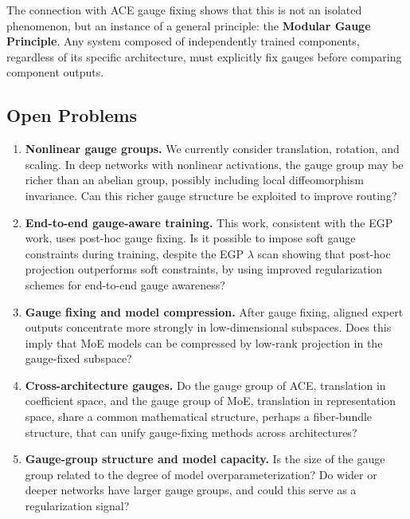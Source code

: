 \documentclass[12pt,a4paper]{article}
\theoremstyle{remark}
\begin{document}
The connection with ACE gauge fixing shows that this is not an isolated phenomenon, but an instance of a general principle: the \textbf{Modular Gauge Principle}. Any system composed of independently trained components, regardless of its specific architecture, must explicitly fix gauges before comparing component outputs.

\subsection{Open Problems}

\begin{enumerate}[label=\textbf{(O\arabic*)}]
    \item \textbf{Nonlinear gauge groups.} We currently consider translation, rotation, and scaling. In deep networks with nonlinear activations, the gauge group may be richer than an abelian group, possibly including local diffeomorphism invariance. Can this richer gauge structure be exploited to improve routing?
    
    \item \textbf{End-to-end gauge-aware training.} This work, consistent with the EGP work, uses post-hoc gauge fixing. Is it possible to impose soft gauge constraints during training, despite the EGP $\lambda$ scan showing that post-hoc projection outperforms soft constraints, by using improved regularization schemes for end-to-end gauge awareness?
    
    \item \textbf{Gauge fixing and model compression.} After gauge fixing, aligned expert outputs concentrate more strongly in low-dimensional subspaces. Does this imply that MoE models can be compressed by low-rank projection in the gauge-fixed subspace?
    
    \item \textbf{Cross-architecture gauges.} Do the gauge group of ACE, translation in coefficient space, and the gauge group of MoE, translation in representation space, share a common mathematical structure, perhaps a fiber-bundle structure, that can unify gauge-fixing methods across architectures?
    
    \item \textbf{Gauge-group structure and model capacity.} Is the size of the gauge group related to the degree of model overparameterization? Do wider or deeper networks have larger gauge groups, and could this serve as a regularization signal?
\end{enumerate}
\end{document}
